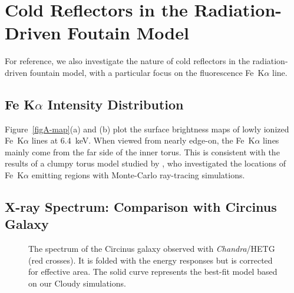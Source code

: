 \documentclass[twocolumn,times,twocolappendix]{aastex63}
\begin{document}
\vspace{5mm}


\newpage
\appendix
\restartappendixnumbering


\section{Cold Reflectors in the Radiation-Driven Foutain Model}
\label{A1}

For reference, we also investigate the nature of cold reflectors in
the radiation-driven fountain model, with a particular focus on the
fluorescence Fe~K$\alpha$ line.

\subsection{Fe K$\alpha$ Intensity Distribution}

\begin{figure*}
\caption{
(a): Surface brightness distribution of Fe~K$\alpha$ at 6.4~keV for $i = 0^\circ$. 
(b): Same as (a) but for $i = 80^\circ$. 
}
\label{figA-map}
\end{figure*}


Figure~\ref{figA-map}(a) and (b) plot the surface brightness maps
of lowly ionized Fe~K$\alpha$ lines at 6.4~keV.
When viewed from nearly edge-on,
the Fe~K$\alpha$ lines mainly come from the far side of the inner
torus. This is consistent with the results of a clumpy torus model
\citep[XCLUMPY;][]{Tanimoto2019} studied by \citet{Uematsu2021}, who
investigated the locations of Fe~K$\alpha$ emitting regions with
Monte-Carlo ray-tracing simulations.



\subsection{X-ray Spectrum: Comparison with Circinus Galaxy}
\label{A1.2}

\begin{figure}
\caption{
The spectrum of the Circinus galaxy
observed with  \textit{Chandra}/HETG (red crosses). It is 
folded with the energy responses but is corrected for effective area.
The solid curve represents the best-fit model based on our \textsf{Cloudy}
simulations. }
\label{figA-spec}
\end{figure}
\end{document}

